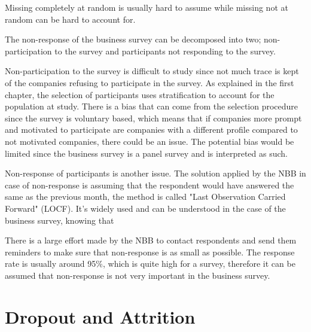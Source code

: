 \documentclass[12pt,a4paper,oneside]{book}
\begin{document}
Missing completely at random is usually hard to assume while missing not at random can be hard to account for.


The non-response of the business survey can be decomposed into two; non-participation to the survey and participants not responding to the survey.

Non-participation to the survey is difficult to study since not much trace is kept of the companies refusing to participate in the survey. As explained in the first chapter, the selection of participants uses stratification to account for the population at study. 
There is a bias that can come from the selection procedure since the survey is voluntary based, which means that if companies more prompt and motivated to participate are companies with a different profile compared to not motivated companies, there could be an issue.
The potential bias would be limited since the business survey is a panel survey and is interpreted as such.

Non-response of participants is another issue. 
The solution applied by the NBB in case of non-response is assuming that the respondent would have answered the same as the previous month, the method is called "Last Observation Carried Forward" (LOCF). 
It's widely used and can be understood in the case of the business survey, knowing that 

There is a large effort made by the NBB to contact respondents and send them reminders to make sure that non-response is as small as possible.
The response rate is usually around 95\%, which is quite high for a survey, therefore it can be assumed that non-response is not very important in the business survey.





\section{Dropout and Attrition}
\end{document}
